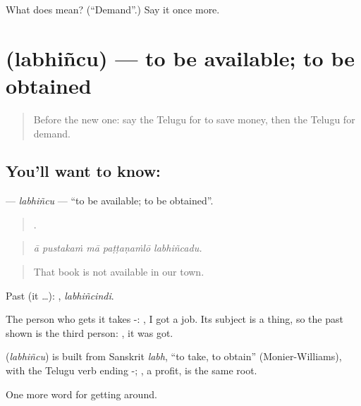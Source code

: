\begin{tcolorbox}[breakable,colback=teal!4,colframe=teal!35!black,title={Before you move on}]
What does  mean? (\textquotedblleft{}Demand\textquotedblright{}.) Say it once more.
\end{tcolorbox}
\section[\texorpdfstring{\te{లభించు} (labhiñcu)}{లభించు (labhiñcu)}]{ (labhiñcu) — to be available; to be obtained}

\label{lesson:TE-C487-labhincu}



\begin{quote}
Before the new one: say the Telugu for to save money, then the Telugu for demand.
\end{quote}

\subsection*{You'll want to know: }
\textbf{} — \emph{labhiñcu} — \textquotedblleft{}to be available; to be obtained\textquotedblright{}.

\begin{quote}
    .
\end{quote}

\begin{quote}
\emph{ā pustakaṁ mā paṭṭaṇaṁlō labhiñcadu.}
\end{quote}

\begin{quote}
That book is not available in our town.
\end{quote}

Past (it …): , \emph{labhiñcindi}.

The person who gets it takes -:   , I got a job. Its subject is a thing, so the past shown is the third person: , it was got.

\begin{cousinweb}
\textbf{} (\emph{labhiñcu}) is built from Sanskrit \emph{labh}, \textquotedblleft{}to take, to obtain\textquotedblright{} (Monier-Williams), with the Telugu verb ending -; , a profit, is the same root.
\end{cousinweb}

\begin{grammarlens}[title={What you've built}]
One more word for getting around.
\end{grammarlens}

